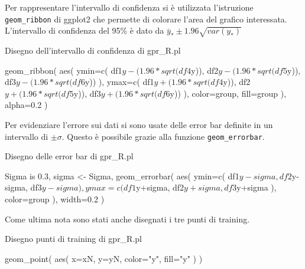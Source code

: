 \documentclass[10pt,titlepage,twoside,a4paper]{report}
\newenvironment{code}{\singlespacing\captionsetup{type=listing}}{}
\begin{document}
Per rappresentare l'intervallo di confidenza si è utilizzata l'istruzione
\texttt{geom\_ribbon} di ggplot2 che permette di colorare l'area del grafico 
interessata. L'intervallo di confidenza del 95\% è dato da $\bar{y}_{\ast} \pm 
1.96\sqrt{var(y_{\ast})}$ 

\begin{minipage}{\textwidth}
\centering
\begin{code}
\caption{Disegno dell'intervallo di confidenza di gpr\_R.pl}
\begin{rcode*}{}
geom_ribbon(
    aes(
        ymin=c(
            df1$y-(1.96*sqrt(df4$y)),
            df2$y-(1.96*sqrt(df5$y)),
            df3$y-(1.96*sqrt(df6$y))
        ),
        ymax=c(
            df1$y+(1.96*sqrt(df4$y)),
            df2$y+(1.96*sqrt(df5$y)),
            df3$y+(1.96*sqrt(df6$y))
        ),
        color=group,
        fill=group
    ),
    alpha=0.2
)
\end{rcode*}
\end{code}
\end{minipage}

Per evidenziare l'errore sui dati si sono usate delle error bar definite in un 
intervallo di $\pm \sigma$. Questo è possibile grazie alla funzione 
\texttt{geom\_errorbar}.

\begin{minipage}{\textwidth}
\centering
\begin{code}
\caption{Disegno delle error bar di gpr\_R.pl}
\begin{rcode*}{}
Sigma is 0.3,
sigma <- Sigma,
geom_errorbar(
    aes(
        ymin=c(
            df1$y-sigma,
            df2$y-sigma,
            df3$y-sigma
        ),
        ymax=c(
            df1$y+sigma,
            df2$y+sigma,
            df3$y+sigma
        ),
        color=group
    ),
    width=0.2
)
\end{rcode*}
\end{code}
\end{minipage}

Come ultima nota sono stati anche disegnati i tre punti di training.

\begin{minipage}{\textwidth}
\centering
\begin{code}
\caption{Disegno punti di training di gpr\_R.pl}
\begin{rcode*}{}
geom_point(
    aes(
        x=xN,
        y=yN,
        color="y",
        fill="y"
    )
)
\end{rcode*}
\end{code}
\end{minipage}
\end{document}
